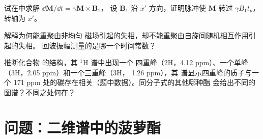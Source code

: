 \begin{exercise}[$\star\star\star$]\label{exo:b3:advanced-nmr:10}
试在中求解 $\dd\mathbf M/\dd t = \gamma\mathbf M\times\mathbf B_1$，
设 $\mathbf B_1$ 沿 $x'$ 方向，证明脉冲使 $\mathbf M$ 转过 $\gamma B_1t_p$，转轴为 $x'$。
\end{exercise}

\begin{exercise}[$\star\star\star$]\label{exo:b3:advanced-nmr:11}
解释为何能重聚由非均匀
磁场引起的失相，却不能重聚由自旋间随机相互作用引起的失相。
回波振幅测量的是哪一个时间常数？
\end{exercise}

\begin{exercise}[$\star\star\star$]\label{exo:b3:advanced-nmr:12}
推断化合物  的结构，其 ${}^1$H 谱中出现一个
四重峰（2H，4.12 ppm）、一个单峰（3H，2.05 ppm）和一个三重峰（3H，
1.26 ppm），其  谱显示四重峰的质子与一个
171 ppm 处的碳存在相关（题中数据）。同分子式的其他哪种酯
会给出不同的  图谱？不同之处何在？
\end{exercise}

\section{问题：二维谱中的菠萝酯}


